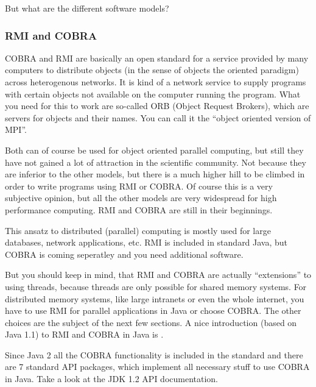 But what are the different software models?
\subsubsection{RMI and COBRA}
COBRA and RMI are basically an open standard for a service
provided by many computers to distribute objects (in the sense of objects
the oriented paradigm) across heterogenous networks. It is kind of a
network service to supply programs with certain objects not available
on the computer running the program. What you need for this to work are
so-called ORB (Object Request Brokers), which are servers for objects and
their names. You can call it the ``object oriented version of MPI''.

Both can of course be used for object oriented parallel computing, but
still they have not gained a lot of attraction in the scientific
community. Not because they are inferior to the other models, but there
is a much higher hill to be climbed in order to write programs using 
RMI or COBRA. Of course this is a very subjective opinion, but all the
other models are very widespread for high performance computing. RMI and
COBRA are still in their beginnings. 

This ansatz to distributed (parallel) computing is mostly used for 
large databases, network applications, etc. RMI is included in standard 
Java, but COBRA is coming seperatley and you need additional software.

But you should keep in mind, that RMI and COBRA are actually ``extensions''
to using threads, because threads are only possible for shared memory
systems. For distributed memory systems, like large intranets or even the
whole internet, you have to use RMI for parallel applications in Java or
choose COBRA. The other choices are the subject of the next few sections.
A nice introduction (based on Java 1.1) 
to RMI and COBRA in Java is \cite[]{DistributedComputing}.

Since Java 2 all the COBRA functionality is included in the
standard and there are 7 standard API packages, which implement
all necessary stuff to use COBRA in Java. Take a look at the 
JDK 1.2 API documentation.



